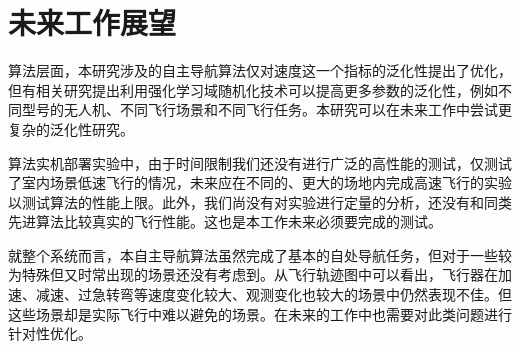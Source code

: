 \section{未来工作展望}

算法层面，本研究涉及的自主导航算法仅对速度这一个指标的泛化性提出了优化，但有相关研究提出利用强化学习域随机化技术可以提高更多参数的泛化性，例如不同型号的无人机、不同飞行场景和不同飞行任务。本研究可以在未来工作中尝试更复杂的泛化性研究。

算法实机部署实验中，由于时间限制我们还没有进行广泛的高性能的测试，仅测试了室内场景低速飞行的情况，未来应在不同的、更大的场地内完成高速飞行的实验以测试算法的性能上限。此外，我们尚没有对实验进行定量的分析，还没有和同类先进算法比较真实的飞行性能。这也是本工作未来必须要完成的测试。

就整个系统而言，本自主导航算法虽然完成了基本的自处导航任务，但对于一些较为特殊但又时常出现的场景还没有考虑到。从飞行轨迹图中可以看出，飞行器在加速、减速、过急转弯等速度变化较大、观测变化也较大的场景中仍然表现不佳。但这些场景却是实际飞行中难以避免的场景。在未来的工作中也需要对此类问题进行针对性优化。


